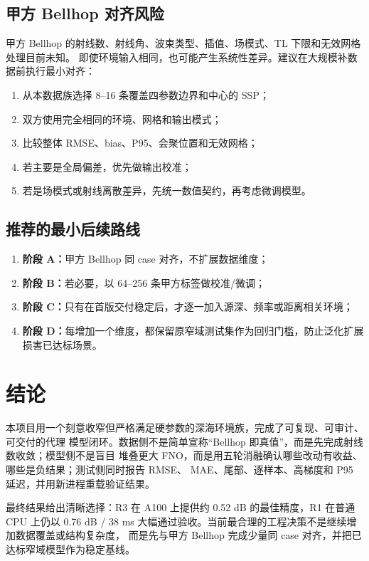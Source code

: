 \documentclass[UTF8,12pt,openany]{ctexrep}
\begin{document}
\section{甲方 Bellhop 对齐风险}

甲方 Bellhop 的射线数、射线角、波束类型、插值、场模式、TL 下限和无效网格处理目前未知。
即使环境输入相同，也可能产生系统性差异。建议在大规模补数据前执行最小对齐：

\begin{enumerate}
  \item 从本数据族选择 8--16 条覆盖四参数边界和中心的 SSP；
  \item 双方使用完全相同的环境、网格和输出模式；
  \item 比较整体 RMSE、bias、P95、会聚位置和无效网格；
  \item 若主要是全局偏差，优先做输出校准；
  \item 若是场模式或射线离散差异，先统一数值契约，再考虑微调模型。
\end{enumerate}

\section{推荐的最小后续路线}

\begin{enumerate}
  \item \textbf{阶段 A：}甲方 Bellhop 同 case 对齐，不扩展数据维度；
  \item \textbf{阶段 B：}若必要，以 64--256 条甲方标签做校准/微调；
  \item \textbf{阶段 C：}只有在首版交付稳定后，才逐一加入源深、频率或距离相关环境；
  \item \textbf{阶段 D：}每增加一个维度，都保留原窄域测试集作为回归门槛，防止泛化扩展
  损害已达标场景。
\end{enumerate}

\chapter{结论}

本项目用一个刻意收窄但严格满足硬参数的深海环境族，完成了可复现、可审计、可交付的代理
模型闭环。数据侧不是简单宣称“Bellhop 即真值”，而是先完成射线数收敛；模型侧不是盲目
堆叠更大 FNO，而是用五轮消融确认哪些改动有收益、哪些是负结果；测试侧同时报告 RMSE、
MAE、尾部、逐样本、高梯度和 P95 延迟，并用新进程重载验证结果。

最终结果给出清晰选择：R3 在 A100 上提供约 0.52 dB 的最佳精度，R1 在普通 CPU 上仍以
0.76 dB / 38 ms 大幅通过验收。当前最合理的工程决策不是继续增加数据覆盖或结构复杂度，
而是先与甲方 Bellhop 完成少量同 case 对齐，并把已达标窄域模型作为稳定基线。
\end{document}

